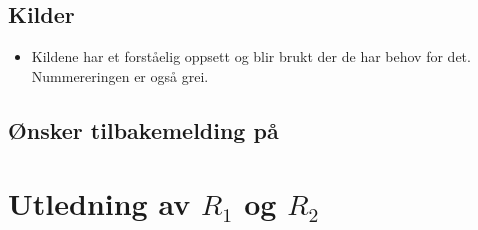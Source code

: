 \documentclass[a4paper,11pt,norsk]{article}
\begin{document}
\subsection{Kilder}
\begin{itemize}
    \item Kildene har et forståelig oppsett og blir brukt der de har behov for det. Nummereringen er også grei.
\end{itemize}

\subsection{Ønsker tilbakemelding på}

\newpage

\appendix
\section{Utledning av $R_1$ og $R_2$}\label{attach:resistors}
\end{document}
